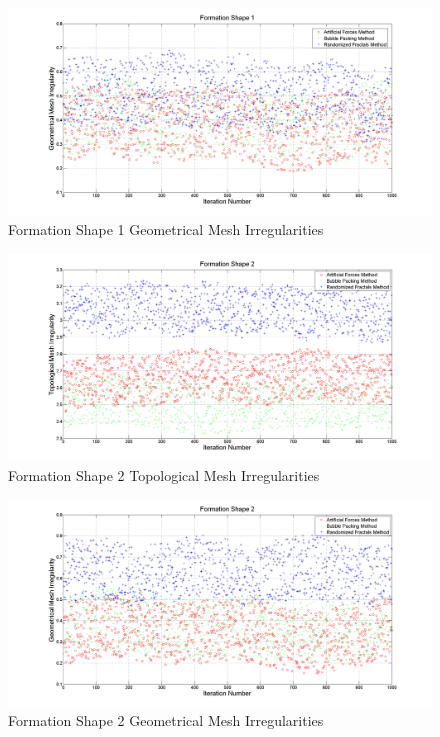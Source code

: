 \begin{figure}[H]
\caption{Formation Shape 1 Geometrical Mesh Irregularities} \label{geometric_ref_1}
\centerline{\includegraphics[scale = 0.35]{Geometrical_Irr_1}}
\end{figure} 	

\begin{figure}[H]
\caption{Formation Shape 2 Topological Mesh Irregularities} \label{topologic_ref_2}
\centerline{\includegraphics[scale = 0.35]{Topological_Irr_2}}
\end{figure} 	
				
\begin{figure}[H]
\caption{Formation Shape 2 Geometrical Mesh Irregularities} \label{geometric_ref_2}
\centerline{\includegraphics[scale = 0.35]{Geometrical_Irr_2}}
\end{figure} 	
		
